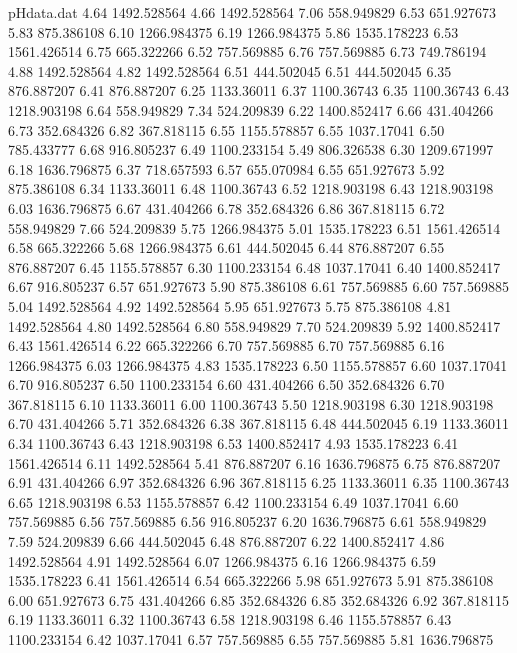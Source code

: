 \begin{filecontents}{pHdata.dat}
4.64 	1492.528564
4.66 	1492.528564
7.06 	558.949829
6.53 	651.927673
5.83 	875.386108
6.10 	1266.984375
6.19 	1266.984375
5.86 	1535.178223
6.53 	1561.426514
6.75 	665.322266
6.52 	757.569885
6.76 	757.569885
6.73 	749.786194
4.88 	1492.528564
4.82 	1492.528564
6.51 	444.502045
6.51 	444.502045
6.35 	876.887207
6.41 	876.887207
6.25 	1133.36011
6.37 	1100.36743
6.35 	1100.36743
6.43 	1218.903198
6.64 	558.949829
7.34 	524.209839
6.22 	1400.852417
6.66 	431.404266
6.73 	352.684326
6.82 	367.818115
6.55 	1155.578857
6.55 	1037.17041
6.50 	785.433777
6.68 	916.805237
6.49 	1100.233154
5.49 	806.326538
6.30 	1209.671997
6.18 	1636.796875
6.37 	718.657593
6.57 	655.070984
6.55 	651.927673
5.92 	875.386108
6.34 	1133.36011
6.48 	1100.36743
6.52 	1218.903198
6.43 	1218.903198
6.03 	1636.796875
6.67 	431.404266
6.78 	352.684326
6.86 	367.818115
6.72 	558.949829
7.66 	524.209839
5.75 	1266.984375
5.01 	1535.178223
6.51 	1561.426514
6.58 	665.322266
5.68 	1266.984375
6.61 	444.502045
6.44 	876.887207
6.55 	876.887207
6.45 	1155.578857
6.30 	1100.233154
6.48 	1037.17041
6.40 	1400.852417
6.67 	916.805237
6.57 	651.927673
5.90 	875.386108
6.61 	757.569885
6.60 	757.569885
5.04 	1492.528564
4.92 	1492.528564
5.95 	651.927673
5.75 	875.386108
4.81 	1492.528564
4.80 	1492.528564
6.80 	558.949829
7.70 	524.209839
5.92 	1400.852417
6.43 	1561.426514
6.22 	665.322266
6.70 	757.569885
6.70 	757.569885
6.16 	1266.984375
6.03 	1266.984375
4.83 	1535.178223
6.50 	1155.578857
6.60 	1037.17041
6.70 	916.805237
6.50 	1100.233154
6.60 	431.404266
6.50 	352.684326
6.70 	367.818115
6.10 	1133.36011
6.00 	1100.36743
5.50 	1218.903198
6.30 	1218.903198
6.70 	431.404266
5.71 	352.684326
6.38 	367.818115
6.48 	444.502045
6.19 	1133.36011
6.34 	1100.36743
6.43 	1218.903198
6.53 	1400.852417
4.93 	1535.178223
6.41 	1561.426514
6.11 	1492.528564
5.41 	876.887207
6.16 	1636.796875
6.75 	876.887207
6.91 	431.404266
6.97 	352.684326
6.96 	367.818115
6.25 	1133.36011
6.35 	1100.36743
6.65 	1218.903198
6.53 	1155.578857
6.42 	1100.233154
6.49 	1037.17041
6.60 	757.569885
6.56 	757.569885
6.56 	916.805237
6.20 	1636.796875
6.61 	558.949829
7.59 	524.209839
6.66 	444.502045
6.48 	876.887207
6.22 	1400.852417
4.86 	1492.528564
4.91 	1492.528564
6.07 	1266.984375
6.16 	1266.984375
6.59 	1535.178223
6.41 	1561.426514
6.54 	665.322266
5.98 	651.927673
5.91 	875.386108
6.00 	651.927673
6.75 	431.404266
6.85 	352.684326
6.85 	352.684326
6.92 	367.818115
6.19 	1133.36011
6.32 	1100.36743
6.58 	1218.903198
6.46 	1155.578857
6.43 	1100.233154
6.42 	1037.17041
6.57 	757.569885
6.55 	757.569885
5.81 	1636.796875

\end{filecontents}
